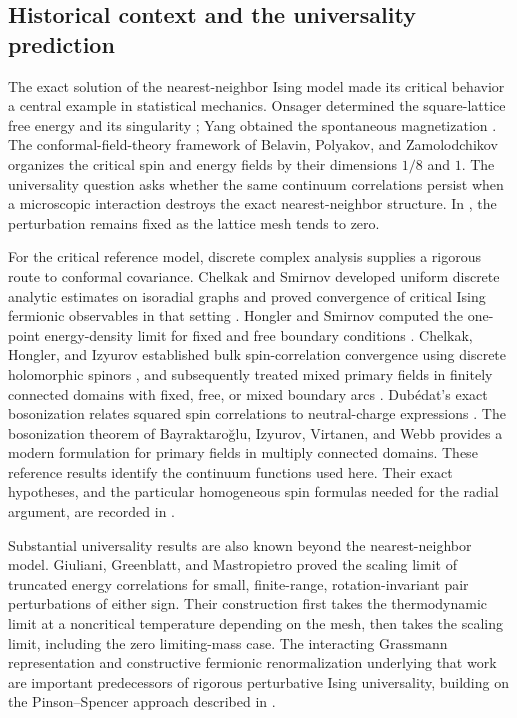 \subsection{Historical context and the universality prediction}

The exact solution of the nearest-neighbor Ising model made its critical
behavior a central example in statistical mechanics. Onsager determined
the square-lattice free energy and its singularity \cite{Onsager1944};
Yang obtained the spontaneous magnetization \cite{Yang1952}. The
conformal-field-theory framework of Belavin, Polyakov, and Zamolodchikov
\cite{BPZ1984} organizes the critical spin and energy fields by their
dimensions $1/8$ and $1$. The universality question asks whether the same
continuum correlations persist when a microscopic interaction destroys
the exact nearest-neighbor structure. In , the
perturbation remains fixed as the lattice mesh tends to zero.

For the critical reference model, discrete complex analysis supplies a
rigorous route to conformal covariance. Chelkak and Smirnov developed
uniform discrete analytic estimates on isoradial graphs
\cite{CS2011} and proved convergence of critical Ising fermionic
observables in that setting \cite{CS2012}. Hongler and Smirnov computed
the one-point energy-density limit for fixed and free boundary
conditions \cite{HS2013}. Chelkak, Hongler, and Izyurov established
bulk spin-correlation convergence using discrete holomorphic spinors
\cite{CHI2015}, and subsequently treated mixed primary fields in
finitely connected domains with fixed, free, or mixed boundary arcs
\cite{CHI2022}. Dub\'edat's exact bosonization relates squared spin
correlations to neutral-charge expressions \cite{Dubedat2011}.
The bosonization theorem of Bayraktaro\u{g}lu, Izyurov, Virtanen, and Webb
\cite{BIVW2025} provides a modern formulation for primary fields in
multiply connected domains. These reference results identify the
continuum functions used here. Their exact hypotheses, and the
particular homogeneous spin formulas needed for the radial argument,
are recorded in .

Substantial universality results are also known beyond the
nearest-neighbor model. Giuliani, Greenblatt, and Mastropietro
\cite[Theorems~1.1--1.2]{GGM2012} proved the scaling limit of truncated energy correlations
for small, finite-range, rotation-invariant pair perturbations of either
sign. Their
construction first takes the thermodynamic limit at a noncritical
temperature depending on the mesh, then takes the scaling limit,
including the zero limiting-mass case. The interacting Grassmann
representation and constructive fermionic renormalization underlying
that work are important predecessors of rigorous perturbative Ising
universality, building on the Pinson--Spencer approach described in
\cite{GGM2012}.

